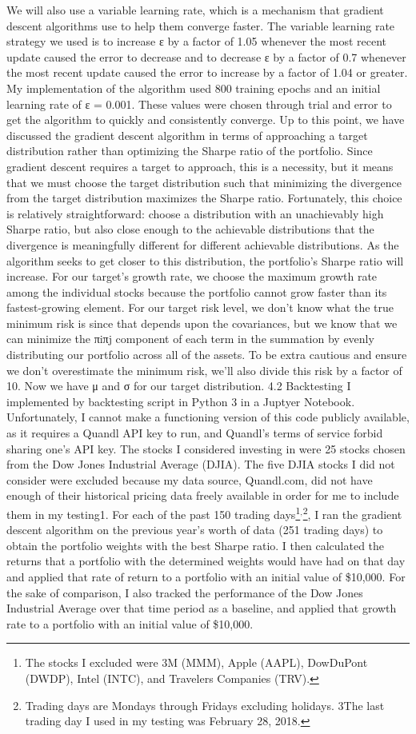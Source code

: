 \documentclass{article}
\begin{document}
We will also use a variable learning rate, which is a mechanism that gradient descent algorithms use to help them converge faster. The variable learning rate strategy we used is to increase ε by a factor of 1.05 whenever the most recent update caused the error to decrease and to decrease ε by a factor of 0.7 whenever the most recent update caused the error to increase by a factor of 1.04 or greater. My implementation of the algorithm used 800 training epochs and an initial learning rate of ε = 0.001. These values were chosen through trial and error to get the algorithm to quickly and consistently converge.
Up to this point, we have discussed the gradient descent algorithm in terms of approaching a target distribution rather than optimizing the Sharpe ratio of the portfolio. Since gradient descent requires a target to approach, this is a necessity, but it means that we must choose the target distribution such that minimizing the divergence from the target distribution maximizes the Sharpe ratio. Fortunately, this choice is relatively straightforward: choose a distribution with an unachievably high Sharpe ratio, but also close enough to the achievable distributions that the divergence is meaningfully different for different achievable distributions. As the algorithm seeks to get closer to this distribution, the portfolio’s Sharpe ratio will increase. For our target’s growth rate, we choose the maximum growth rate among the individual stocks because the portfolio cannot grow faster than its fastest-growing element. For our target risk level, we don’t know what the true minimum risk is since that depends upon the covariances, but we know that we can minimize the πiπj component of each term in the summation by evenly distributing our portfolio across all of the assets. To be extra cautious and ensure we don’t overestimate the minimum risk, we’ll also divide this risk by a factor of 10. Now we have μ and σ for our target distribution.
4.2 Backtesting
I implemented by backtesting script in Python 3 in a Juptyer Notebook. Unfortunately, I cannot make a functioning version of this code publicly available, as it requires a Quandl API key to run, and Quandl’s terms of service forbid sharing one’s API key. The stocks I considered investing in were 25 stocks chosen from the Dow Jones Industrial Average (DJIA). The five DJIA stocks I did not consider were excluded because my data source, Quandl.com, did not have enough of their historical pricing data freely available in order for me to include them in my testing1.
For each of the past 150 trading days\footnote{The stocks I excluded were 3M (MMM), Apple (AAPL), DowDuPont (DWDP), Intel (INTC), and Travelers Companies (TRV).}$^,$\footnote{Trading days are Mondays through Fridays excluding holidays. 3The last trading day I used in my testing was February 28, 2018.}, I ran the gradient descent algorithm on the previous year’s worth of data (251 trading days) to obtain the portfolio weights with the best Sharpe ratio.
I then calculated the returns that a portfolio with the determined weights would have had on that day and applied that rate of return to a portfolio with an initial value of \$10,000. For the sake of comparison, I also tracked the performance of the Dow Jones Industrial Average over that time period as a baseline, and applied that growth rate to a portfolio with an initial value of \$10,000.
\end{document}
